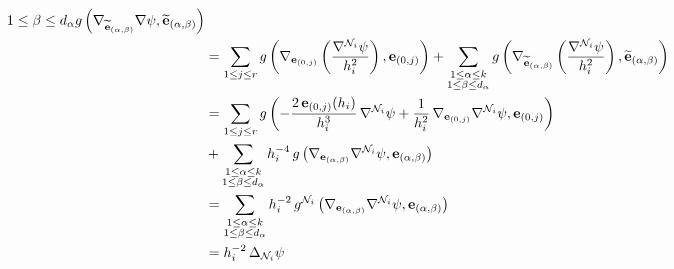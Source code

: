 \begin{demm}
\begin{align*}
{{1 \leq \beta \leq d_{\alpha}}} g\left(  \nabla_{\widetilde{\mathbf{e}}_{(\alpha, \beta)}} \nabla \psi, \widetilde{\mathbf{e}}_{(\alpha, \beta)} \right) \\
&= \sum_{1 \leq j \leq r} g\left(  \nabla_{\mathbf{e}_{(0, j)}} \left(  \frac{\nabla^{\mathcal{N}_i} \psi}{h_i^2} \right), \mathbf{e}_{(0, j)}   \right) + \sum_{\substack{1 \leq \alpha \leq k \\
1 \leq \beta \leq d_{\alpha}}} g\left( \nabla_{\widetilde{\mathbf{e}}_{(\alpha, \beta)}} \left( \frac{\nabla^{\mathcal{N}_i} \psi}{h_i^2}  \right) , \widetilde{\mathbf{e}}_{(\alpha, \beta)} \right) \\
&= \sum_{1 \leq j \leq r} g\left(  -\frac{2 \, \mathbf{e}_{(0, j)}(h_i)}{h_i^3} \, \nabla^{\mathcal{N}_i} \psi + \frac{1}{h_i^2} \, \nabla_{\mathbf{e}_{(0, j)}} \nabla^{\mathcal{N}_i} \psi, \mathbf{e}_{(0, j)}  \right) \\
&+\sum_{\substack{1 \leq \alpha \leq k \\
1 \leq \beta \leq d_{\alpha}}} h_i^{-4} \, g\left( \nabla_{\mathbf{e}_{(\alpha, \beta)}} \nabla^{\mathcal{N}_i} \psi, \mathbf{e}_{(\alpha, \beta)}  \right) \\
&= \sum_{\substack{1 \leq \alpha \leq k \\
1 \leq \beta \leq d_{\alpha}}} h_i^{-2} \, g^{\mathcal{N}_i}\left( \nabla_{\mathbf{e}_{(\alpha, \beta)}} \nabla^{\mathcal{N}_i} \psi, \mathbf{e}_{(\alpha, \beta)}  \right) \\
&= h_i^{-2} \, \Delta_{\mathcal{N}_i} \psi
\end{align*}
\end{demm}


